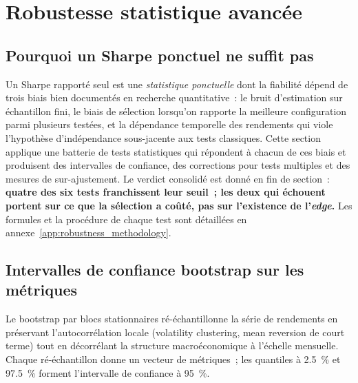 \section{Robustesse statistique avancée}
\label{sec:advanced_robustness}

\subsection{Pourquoi un Sharpe ponctuel ne suffit pas}

Un Sharpe rapporté seul est une \emph{statistique ponctuelle} dont la fiabilité dépend de trois biais bien documentés en recherche quantitative~: le bruit d'estimation sur échantillon fini, le biais de sélection lorsqu'on rapporte la meilleure configuration parmi plusieurs testées, et la dépendance temporelle des rendements qui viole l'hypothèse d'indépendance sous-jacente aux tests classiques. Cette section applique une batterie de tests statistiques qui répondent à chacun de ces biais et produisent des intervalles de confiance, des corrections pour tests multiples et des mesures de sur-ajustement. Le verdict consolidé est donné en fin de section~: \textbf{quatre des six tests franchissent leur seuil~; les deux qui échouent portent sur ce que la sélection a coûté, pas sur l'existence de l'\emph{edge}.} Les formules et la procédure de chaque test sont détaillées en annexe~\ref{app:robustness_methodology}.

\subsection{Intervalles de confiance bootstrap sur les métriques}

Le bootstrap par blocs stationnaires ré-échantillonne la série de rendements en préservant l'autocorrélation locale (volatility clustering, mean reversion de court terme) tout en décorrélant la structure macroéconomique à l'échelle mensuelle. Chaque ré-échantillon donne un vecteur de métriques~; les quantiles à 2.5~\% et 97.5~\% forment l'intervalle de confiance à 95~\%.

